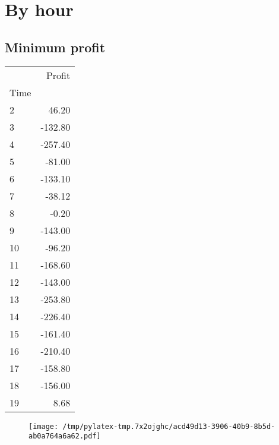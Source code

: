 \documentclass{article}%
\begin{document}
%
\newpage %
\section{By hour}%
\label{sec:Byhour}%
\subsection{Minimum profit }%
\label{subsec:Minimumprofit}%
\begin{tabular}{lr}
\toprule
{} &  Profit \\
Time &         \\
\midrule
2    &   46.20 \\
3    & -132.80 \\
4    & -257.40 \\
5    &  -81.00 \\
6    & -133.10 \\
7    &  -38.12 \\
8    &   -0.20 \\
9    & -143.00 \\
10   &  -96.20 \\
11   & -168.60 \\
12   & -143.00 \\
13   & -253.80 \\
14   & -226.40 \\
15   & -161.40 \\
16   & -210.40 \\
17   & -158.80 \\
18   & -156.00 \\
19   &    8.68 \\
\bottomrule
\end{tabular}
%


\begin{figure}[htbp]%
\centering%
\texttt{[image: /tmp/pylatex-tmp.7x2ojghc/acd49d13-3906-40b9-8b5d-ab0a764a6a62.pdf]}%
\end{figure}

%
\newpage %
\end{document}
